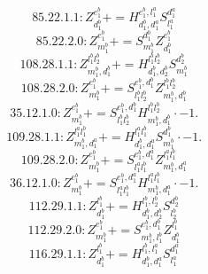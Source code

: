\documentclass[letterpaper,10pt,fleqn,leqno,onecolumn]{article}
\begin{document}
\begin{equation} \;\;\;\;\;\;  85.22.1.1: Z^{e_{1}^{b}}_{d_{1}^{b}}+=H^{e_{1}^{b},l_{1}^{a}}_{d_{1}^{b},d_{1}^{a}}S^{d_{1}^{a}}_{l_{1}^{a}} \end{equation}
\begin{equation} \;\;\;\;\;\;  85.22.2.0: Z^{e_{1}^{b}}_{m_{1}^{b}}+=S^{d_{1}^{b}}_{m_{1}^{b}}Z^{e_{1}^{b}}_{d_{1}^{b}} \end{equation}
\begin{equation} \;\;\;\;\;\;  108.28.1.1: Z^{l_{1}^{b}l_{2}^{b}}_{m_{1}^{b},d_{1}^{b}}+=H^{l_{1}^{b}l_{2}^{b}}_{d_{1}^{b},d_{2}^{b}}S^{d_{2}^{b}}_{m_{1}^{b}} \end{equation}
\begin{equation} \;\;\;\;\;\;  108.28.2.0: Z^{e_{1}^{b}}_{m_{1}^{b}}+=S^{e_{1}^{b},d_{1}^{b}}_{l_{1}^{b}l_{2}^{b}}Z^{l_{1}^{b}l_{2}^{b}}_{m_{1}^{b},d_{1}^{b}} \end{equation}
\begin{equation} \;\;\;\;\;\;  35.12.1.0: Z^{e_{1}^{b}}_{m_{1}^{b}}+=S^{e_{1}^{b},d_{1}^{b}}_{l_{1}^{b}l_{2}^{b}}H^{l_{1}^{b}l_{2}^{b}}_{m_{1}^{b},d_{1}^{b}}\cdot -1. \end{equation}
\begin{equation} \;\;\;\;\;\;  109.28.1.1: Z^{l_{1}^{a}l_{1}^{b}}_{m_{1}^{b},d_{1}^{a}}+=H^{l_{1}^{a}l_{1}^{b}}_{d_{1}^{b},d_{1}^{a}}S^{d_{1}^{b}}_{m_{1}^{b}}\cdot -1. \end{equation}
\begin{equation} \;\;\;\;\;\;  109.28.2.0: Z^{e_{1}^{b}}_{m_{1}^{b}}+=S^{e_{1}^{b},d_{1}^{a}}_{l_{1}^{a}l_{1}^{b}}Z^{l_{1}^{a}l_{1}^{b}}_{m_{1}^{b},d_{1}^{a}} \end{equation}
\begin{equation} \;\;\;\;\;\;  36.12.1.0: Z^{e_{1}^{b}}_{m_{1}^{b}}+=S^{e_{1}^{b},d_{1}^{a}}_{l_{1}^{a}l_{1}^{b}}H^{l_{1}^{a}l_{1}^{b}}_{m_{1}^{b},d_{1}^{a}}\cdot -1. \end{equation}
\begin{equation} \;\;\;\;\;\;  112.29.1.1: Z^{l_{1}^{b}}_{d_{1}^{b}}+=H^{l_{1}^{b},l_{2}^{b}}_{d_{1}^{b},d_{2}^{b}}S^{d_{2}^{b}}_{l_{2}^{b}} \end{equation}
\begin{equation} \;\;\;\;\;\;  112.29.2.0: Z^{e_{1}^{b}}_{m_{1}^{b}}+=S^{e_{1}^{b},d_{1}^{b}}_{m_{1}^{b},l_{1}^{b}}Z^{l_{1}^{b}}_{d_{1}^{b}} \end{equation}
\begin{equation} \;\;\;\;\;\;  116.29.1.1: Z^{l_{1}^{b}}_{d_{1}^{b}}+=H^{l_{1}^{b},l_{1}^{a}}_{d_{1}^{b},d_{1}^{a}}S^{d_{1}^{a}}_{l_{1}^{a}} \end{equation}
\end{document}
